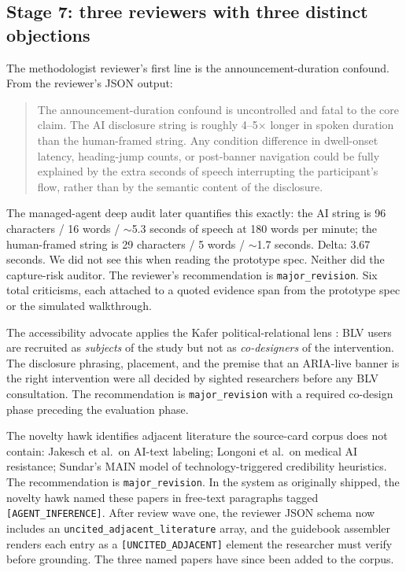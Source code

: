 \subsection{Stage 7: three reviewers with three distinct objections}

The methodologist reviewer's first line is the announcement-duration confound. From the reviewer's JSON output:

\begin{quote}
The announcement-duration confound is uncontrolled and fatal to the core claim. The AI disclosure string is roughly 4--5$\times$ longer in spoken duration than the human-framed string. Any condition difference in dwell-onset latency, heading-jump counts, or post-banner navigation could be fully explained by the extra seconds of speech interrupting the participant's flow, rather than by the semantic content of the disclosure.
\end{quote}

The managed-agent deep audit later quantifies this exactly: the AI string is 96 characters / 16 words / $\sim$5.3 seconds of speech at 180 words per minute; the human-framed string is 29 characters / 5 words / $\sim$1.7 seconds. Delta: 3.67 seconds. We did not see this when reading the prototype spec. Neither did the capture-risk auditor. The reviewer's recommendation is \texttt{major\_revision}. Six total criticisms, each attached to a quoted evidence span from the prototype spec or the simulated walkthrough.

The accessibility advocate applies the Kafer political-relational lens \citep{kafer2013feminist}: BLV users are recruited as \emph{subjects} of the study but not as \emph{co-designers} of the intervention. The disclosure phrasing, placement, and the premise that an ARIA-live banner is the right intervention were all decided by sighted researchers before any BLV consultation. The recommendation is \texttt{major\_revision} with a required co-design phase preceding the evaluation phase.

The novelty hawk identifies adjacent literature the source-card corpus does not contain: Jakesch et al.\ on AI-text labeling; Longoni et al.\ on medical AI resistance; Sundar's MAIN model of technology-triggered credibility heuristics. The recommendation is \texttt{major\_revision}. In the system as originally shipped, the novelty hawk named these papers in free-text paragraphs tagged \texttt{[AGENT\_INFERENCE]}. After review wave one, the reviewer JSON schema now includes an \texttt{uncited\_adjacent\_literature} array, and the guidebook assembler renders each entry as a \texttt{[UNCITED\_ADJACENT]} element the researcher must verify before grounding. The three named papers have since been added to the corpus.

